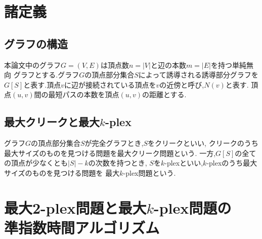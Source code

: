 \documentclass{thesis}
\theoremstyle{definition}
\begin{document}
\newpage

\chapter{諸定義}

\section{グラフの構造}
本論文中のグラフ$G=(V,E)$は頂点数$n=|V|$と辺の本数$m=|E|$を持つ単純無向
グラフとする.グラフ$G$の頂点部分集合$S$によって誘導される誘導部分グラフを
$G[S]$と表す.頂点$v$に辺が接続されている頂点を$v$の近傍と呼び,$N(v)$と表す.
頂点$(u,v)$間の最短パスの本数を頂点$(u,v)$の距離とする.

\section{最大クリークと最大$k$-plex}
グラフ$G$の頂点部分集合$S$が完全グラフとき,$S$をクリークといい,
クリークのうち最大サイズのものを見つける問題を最大クリーク問題という.
一方,$G[S]$の全ての頂点が少なくとも$|S| - k$の次数を持つとき,
$S$を$k$-plexといい,$k$-plexのうち最大サイズのものを見つける問題を
最大$k$-plex問題という.


\newpage

\chapter{最大2-plex問題と最大$k$-plex問題の \\ 準指数時間アルゴリズム}
\end{document}
